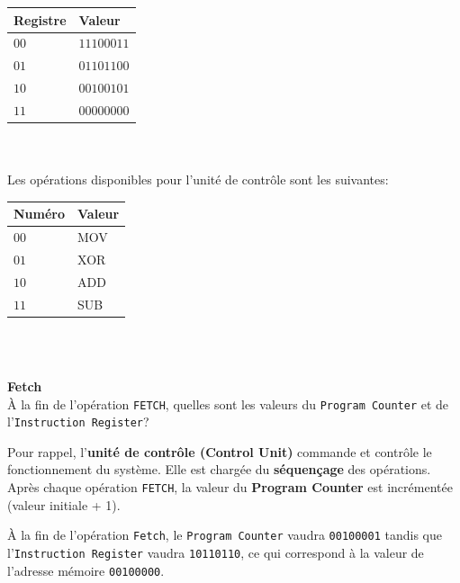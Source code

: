 \begin{tabular}{| C{0.13\textwidth} | C{0.13\textwidth} |} 
    \hline
    \textbf{Registre} & \textbf{Valeur}\\ [0.5ex]
    \hline
    $00$ & $11100011$\\ [0.5ex] 
    \hline
    $01$ & $01101100$\\ [0.5ex] 
    \hline
    $10$ & $00100101$\\ [0.5ex] 
    \hline
    $11$ & $00000000$\\ [0.5ex]
    \hline
\end{tabular}
\\\\
Les opérations disponibles pour l'unité de contrôle sont les suivantes:
\\
\begin{tabular}{| C{0.13\textwidth} | C{0.13\textwidth} |} 
    \hline
    \textbf{Numéro} & \textbf{Valeur}\\ [0.5ex]
    \hline
    $00$ & MOV\\ [0.5ex] 
    \hline
    $01$ & XOR\\ [0.5ex] 
    \hline
    $10$ & ADD\\ [0.5ex] 
    \hline
    $11$ & SUB\\ [0.5ex]
    \hline
\end{tabular}
\\\\


\begin{Exercice}[10 minutes]\textbf{Fetch}\\

    À la fin de l'opération \lstinline{FETCH}, quelles sont les valeurs du \lstinline{Program Counter} et de l'\lstinline{Instruction Register}?

    \begin{conseil}
        Pour rappel, l'\textbf{unité de contrôle (Control Unit)} commande et contrôle le fonctionnement du système. Elle est chargée du \textbf{séquençage} des opérations. Après chaque opération \lstinline{FETCH}, la valeur du \textbf{Program Counter} est incrémentée (valeur initiale + 1).
    \end{conseil}

    \begin{solution}
        À la fin de l'opération \lstinline{Fetch}, le \lstinline{Program Counter} vaudra \lstinline{00100001} tandis que l'\lstinline{Instruction Register} vaudra \lstinline{10110110}, ce qui correspond à la valeur de l'adresse mémoire \lstinline{00100000}.
    \end{solution}
\end{Exercice}

